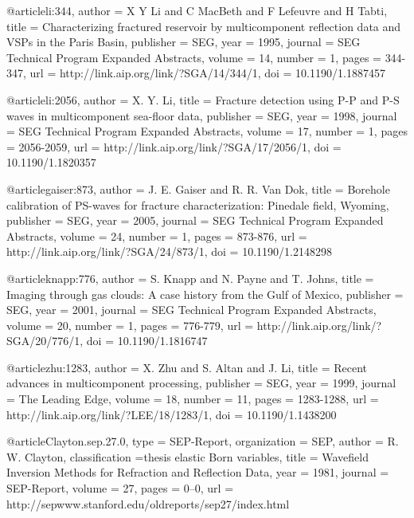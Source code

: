 {@article{li:344,
  author =	 {X Y Li and C MacBeth and F
                  Lefeuvre and H Tabti},
  title =	 {Characterizing fractured reservoir by multicomponent
                  reflection data and {VSP}s in the Paris Basin},
  publisher =	 {SEG},
  year =	 1995,
  journal =	 {SEG Technical Program Expanded Abstracts},
  volume =	 14,
  number =	 1,
  pages =	 {344-347},
  url =		 {http://link.aip.org/link/?SGA/14/344/1},
  doi =		 {10.1190/1.1887457}
}

@article{li:2056,
  author =	 {X. Y. Li},
  title =	 {Fracture detection using {P}-{P} and {P}-{S} waves
                  in multicomponent sea-floor data},
  publisher =	 {SEG},
  year =	 1998,
  journal =	 {SEG Technical Program Expanded Abstracts},
  volume =	 17,
  number =	 1,
  pages =	 {2056-2059},
  url =		 {http://link.aip.org/link/?SGA/17/2056/1},
  doi =		 {10.1190/1.1820357}
}

@article{gaiser:873,
  author =	 {J. E. Gaiser and R. R. Van Dok},
  title =	 {Borehole calibration of PS-waves for fracture
                  characterization: Pinedale field, Wyoming},
  publisher =	 {SEG},
  year =	 2005,
  journal =	 {SEG Technical Program Expanded Abstracts},
  volume =	 24,
  number =	 1,
  pages =	 {873-876},
  url =		 {http://link.aip.org/link/?SGA/24/873/1},
  doi =		 {10.1190/1.2148298}
}

@article{knapp:776,
  author =	 {S. Knapp and N. Payne and T. Johns},
  title =	 {Imaging through gas clouds: A case history from the
                  Gulf of Mexico},
  publisher =	 {SEG},
  year =	 2001,
  journal =	 {SEG Technical Program Expanded Abstracts},
  volume =	 20,
  number =	 1,
  pages =	 {776-779},
  url =		 {http://link.aip.org/link/?SGA/20/776/1},
  doi =		 {10.1190/1.1816747}
}

@article{zhu:1283,
  author =	 {X. Zhu and S. Altan and J. Li},
  title =	 {Recent advances in multicomponent processing},
  publisher =	 {SEG},
  year =	 1999,
  journal =	 {The Leading Edge},
  volume =	 18,
  number =	 11,
  pages =	 {1283-1288},
  url =		 {http://link.aip.org/link/?LEE/18/1283/1},
  doi =		 {10.1190/1.1438200}
}

@article{Clayton.sep.27.0,
  type =	 {SEP-Report},
  organization = {SEP},
  author =	 {R. W. Clayton},
  classification ={thesis elastic {Born} variables},
  title =	 {Wavefield Inversion Methods for Refraction and
                  Reflection Data},
  year =	 1981,
  journal =	 {SEP-Report},
  volume =	 27,
  pages =	 {0--0},
  url =
                  {http://sepwww.stanford.edu/oldreports/sep27/index.html}
}

}
